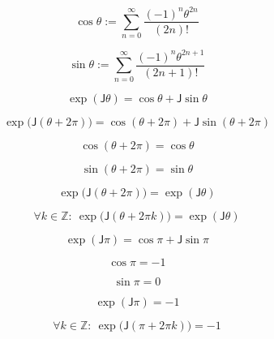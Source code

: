\documentclass[12pt]{article}
\begin{document}
\begin{equation}
\cos\theta:=\sum_{n=0}^{\infty}\frac{(-1)^n\theta^{2n}}{(2n)!}
\end{equation}

\begin{equation}
\sin\theta:=\sum_{n=0}^{\infty}\frac{(-1)^n\theta^{2n+1}}{(2n+1)!}
\end{equation}

\begin{equation}
\exp(\mathsf{J}\theta)=\cos\theta+\mathsf{J}\sin\theta
\end{equation}

\begin{equation}
\exp\bigl(\mathsf{J}(\theta+2\pi)\bigr)=\cos(\theta+2\pi)+\mathsf{J}\sin(\theta+2\pi)
\end{equation}

\begin{equation}
\cos(\theta+2\pi)=\cos\theta
\end{equation}

\begin{equation}
\sin(\theta+2\pi)=\sin\theta
\end{equation}

\begin{equation}
\exp\bigl(\mathsf{J}(\theta+2\pi)\bigr)=\exp(\mathsf{J}\theta)
\end{equation}

\begin{equation}
\forall k\in\mathbb{Z}:\ \exp\bigl(\mathsf{J}(\theta+2\pi k)\bigr)=\exp(\mathsf{J}\theta)
\end{equation}

\begin{equation}
\exp(\mathsf{J}\pi)=\cos\pi+\mathsf{J}\sin\pi
\end{equation}

\begin{equation}
\cos\pi=-1
\end{equation}

\begin{equation}
\sin\pi=0
\end{equation}

\begin{equation}
\exp(\mathsf{J}\pi)=-1
\end{equation}

\begin{equation}
\forall k\in\mathbb{Z}:\ \exp\bigl(\mathsf{J}(\pi+2\pi k)\bigr)=-1
\end{equation}
\end{document}
